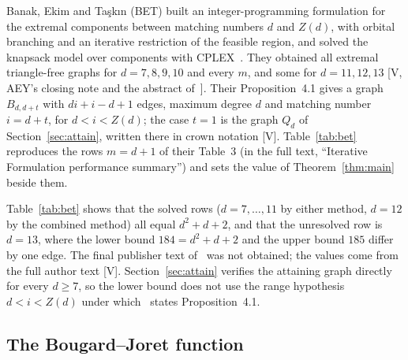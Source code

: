 \documentclass[11pt]{article}
\theoremstyle{remark}
\begin{document}
Banak, Ekim and Ta\c{s}k\i n (BET) built an integer-programming formulation for the extremal components between matching numbers $d$ and $Z(d)$, with orbital branching and an iterative restriction of the feasible region, and solved the knapsack model over components with CPLEX~\cite{BET}. They obtained all extremal triangle-free graphs for $d=7,8,9,10$ and every $m$, and some for $d=11,12,13$ [V, AEY's closing note and the abstract of~\cite{BET}]. Their Proposition~4.1 gives a graph $B_{d,d+t}$ with $di+i-d+1$ edges, maximum degree $d$ and matching number $i=d+t$, for $d<i<Z(d)$; the case $t=1$ is the graph $Q_d$ of Section~\ref{sec:attain}, written there in crown notation [V]. Table~\ref{tab:bet} reproduces the rows $m=d+1$ of their Table~3 (in the full text, ``Iterative Formulation performance summary'') and sets the value of Theorem~\ref{thm:main} beside them.

\begin{table}[ht]
\centering\footnotesize

\caption{Rows $m=d+1$ of the computations of Banak, Ekim and Ta\c{s}k\i n (their Table 3, values typed from the full text, times in seconds as printed, with the limit 1800 on unsolved rows) beside the value $d^2+d+2$ of Theorem~\ref{thm:main}. The two methods close $d=7,\ldots,11$; at $d=12$ only the combined method closes the gap, and at $d=13$ the interval $[184,185]$ remains.}
\label{tab:bet}
\end{table}

Table~\ref{tab:bet} shows that the solved rows ($d=7,\ldots,11$ by either method, $d=12$ by the combined method) all equal $d^2+d+2$, and that the unresolved row is $d=13$, where the lower bound $184=d^2+d+2$ and the upper bound $185$ differ by one edge. The final publisher text of~\cite{BET} was not obtained; the values come from the full author text [V]. Section~\ref{sec:attain} verifies the attaining graph directly for every $d\ge7$, so the lower bound does not use the range hypothesis $d<i<Z(d)$ under which~\cite{BET} states Proposition~4.1.

\subsection{The Bougard--Joret function}
\end{document}
